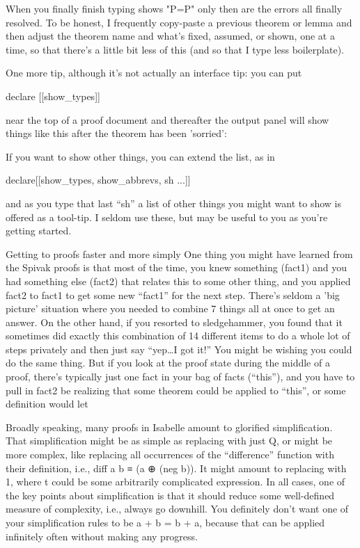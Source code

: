 When you finally finish typing 
shows "P=P"
only then are the errors all finally resolved. To be honest, I frequently copy-paste a previous theorem or lemma and then adjust the theorem name and what's fixed, assumed, or shown, one at a time, so that there's a little bit less of this (and so that I type less boilerplate). 

One more tip, although it's not actually an interface tip: you can put 
\begin{IS}
    declare [[show_types]]
\end{IS}
near the top of a proof document and thereafter the output panel will show things like this after the  theorem has been 'sorried':

If you want to show other things, you can extend the list, as in 
\begin{IS}
declare[[show_types, show_abbrevs, sh ...]]
\end{IS}
and as you type that last ``sh'' a list of other things you might want to show is offered as a tool-tip. I seldom use these, but  may be useful to you as you're getting started. 

Getting to proofs faster and more simply
One thing you might have learned from the Spivak proofs is that most of the time, you knew something (fact1) and you had something else (fact2) that relates this to some other thing, and you applied fact2 to fact1 to get some new ``fact1'' for the next step. There's seldom a 'big picture' situation where you needed to combine 7 things all at once to get an answer. On the other hand, if you resorted to sledgehammer, you found that it sometimes did exactly this combination of 14 different items to do a whole lot of steps privately and then just say ``yep\ldots I got it!'' You might be wishing you could do the same thing. But if you look at the proof state during the middle of a proof, there's typically just one fact in your bag of facts (``this''), and you have to pull in fact2 be realizing that some theorem could be applied to ``this'', or some definition would let %


Broadly speaking, many proofs in Isabelle amount to glorified simplification. That simplification might be as simple as replacing  with just Q, or might be more complex, like replacing all occurrences of the ``difference'' function with their definition, i.e., diff a b ≡ (a ⊕ (neg b)). It might amount to replacing  with 1, where t could be some arbitrarily complicated expression. In all cases, one of the key points about simplification is that it should reduce some well-defined measure of complexity, i.e., always go downhill. You definitely don't want one of your simplification rules to be a + b = b + a, because that can be applied infinitely often without making any progress. 

